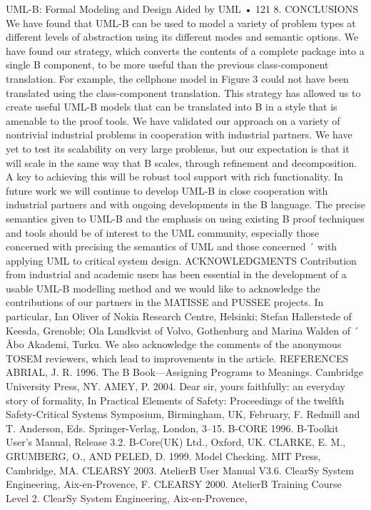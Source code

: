 UML-B: Formal Modeling and Design Aided by UML • 121
8. CONCLUSIONS
We have found that UML-B can be used to model a variety of problem types at
different levels of abstraction using its different modes and semantic options.
We have found our strategy, which converts the contents of a complete package
into a single B component, to be more useful than the previous class-component
translation. For example, the cellphone model in Figure 3 could not have been
translated using the class-component translation. This strategy has allowed us
to create useful UML-B models that can be translated into B in a style that
is amenable to the proof tools. We have validated our approach on a variety of
nontrivial industrial problems in cooperation with industrial partners. We have
yet to test its scalability on very large problems, but our expectation is that it
will scale in the same way that B scales, through refinement and decomposition. A key to achieving this will be robust tool support with rich functionality.
In future work we will continue to develop UML-B in close cooperation with
industrial partners and with ongoing developments in the B language.
The precise semantics given to UML-B and the emphasis on using existing
B proof techniques and tools should be of interest to the UML community, especially those concerned with precising the semantics of UML and those concerned ´
with applying UML to critical system design.
ACKNOWLEDGMENTS
Contribution from industrial and academic users has been essential in the
development of a usable UML-B modelling method and we would like to acknowledge the contributions of our partners in the MATISSE and PUSSEE
projects. In particular, Ian Oliver of Nokia Research Centre, Helsinki; Stefan Hallerstede of Keesda, Grenoble; Ola Lundkvist of Volvo, Gothenburg and
Marina Walden of ´ Åbo Akademi, Turku. We also acknowledge the comments of
the anonymous TOSEM reviewers, which lead to improvements in the article.
REFERENCES
ABRIAL, J. R. 1996. The B Book—Assigning Programs to Meanings. Cambridge University Press,
NY.
AMEY, P. 2004. Dear sir, yours faithfully: an everyday story of formality, In Practical Elements of
Safety: Proceedings of the twelfth Safety-Critical Systems Symposium, Birmingham, UK, February, F. Redmill and T. Anderson, Eds. Springer-Verlag, London, 3–15.
B-CORE 1996. B-Toolkit User’s Manual, Release 3.2. B-Core(UK) Ltd., Oxford, UK.
CLARKE, E. M., GRUMBERG, O., AND PELED, D. 1999. Model Checking. MIT Press, Cambridge, MA.
CLEARSY 2003. AtelierB User Manual V3.6. ClearSy System Engineering, Aix-en-Provence, F.
CLEARSY 2000. AtelierB Training Course Level 2. ClearSy System Engineering, Aix-en-Provence,
